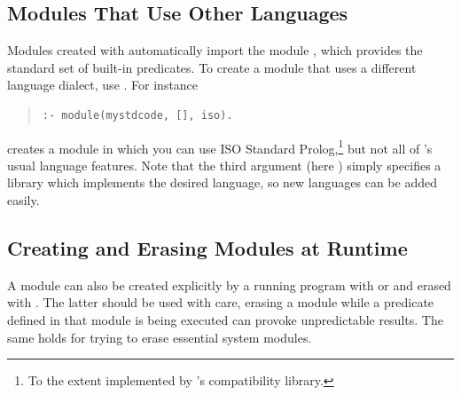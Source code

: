 \subsection{Modules That Use Other Languages}

Modules created with 
automatically import the module
,  which provides the standard
set of {\eclipse} built-in predicates.
To create a module that uses a different language dialect, use
.
For instance
\begin{quote}
\begin{verbatim}
:- module(mystdcode, [], iso).
\end{verbatim}
\end{quote}
creates a module in which you can use ISO Standard Prolog,\footnote{%
  To the extent implemented by {\eclipse}'s compatibility library.}
but not all of {\eclipse}'s usual language features.
Note that the third argument (here ) simply
specifies a library which implements the desired language,
so new languages can be added easily.


\subsection{Creating and Erasing Modules at Runtime}
\begin{sloppypar}
A module can also be created explicitly by a running program with
 or
and erased with
.
The latter should be used with care, erasing a module while a
predicate defined in that module is being executed can provoke
unpredictable results. The same holds for trying to erase essential
system modules.
\end{sloppypar}


